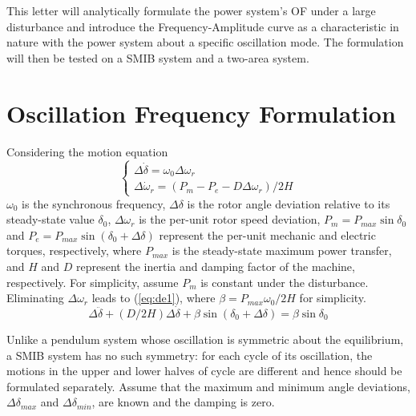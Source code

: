 \documentclass[journal]{IEEEtran}
\begin{document}
This letter will analytically formulate the power system's OF under a large disturbance and introduce the Frequency-Amplitude curve as a characteristic in nature with the power system about a specific oscillation mode. The formulation will then be tested on a SMIB system and a two-area system.





\section{Oscillation Frequency Formulation}
Considering the motion equation
\begin{equation} \label{eq:swing}
\left\{ \begin{array}{ll}
\Delta\dot{\delta}=\omega_{0}\Delta\omega_{r} \\
\Delta\dot{\omega}_{r}=(P_{m}-P_{e}-D\Delta\omega_{r})/2H
\end{array} \right.
\end{equation}
$\omega_{0}$ is the synchronous frequency, $\Delta\delta$ is the rotor angle deviation relative to its steady-state value $\delta_{0}$, $\Delta\omega_{r}$ is the per-unit rotor speed deviation, $P_{m}=P_{max}\sin\delta_{0}$ and $P_{e}=P_{max}\sin(\delta_{0}+\Delta\delta)$ represent the per-unit mechanic and electric torques, respectively, where $P_{max}$ is the steady-state maximum power transfer, and $H$ and $D$ represent the inertia and damping factor of the machine, respectively. For simplicity, assume $P_{m}$ is constant under the disturbance. Eliminating $\Delta\omega_{r}$ leads to (\ref{eq:de1}), where $\beta=P_{max}\omega_{0}/2H$ for simplicity.
\begin{equation} \label{eq:de1}
\Delta\ddot{\delta}+(D/2H)\Delta\dot{\delta}+\beta\sin(\delta_{0}+\Delta\delta)=\beta\sin\delta_{0}
\end{equation}


Unlike a pendulum system whose oscillation is symmetric about the equilibrium, a SMIB system has no such symmetry\cite{pendulum}: for each cycle of its oscillation, the motions in the upper and lower halves of cycle are different and hence should be formulated separately. Assume that the maximum and minimum angle deviations, $\Delta\delta_{max}$ and $\Delta\delta_{min}$, are known and the damping is zero.
\end{document}
